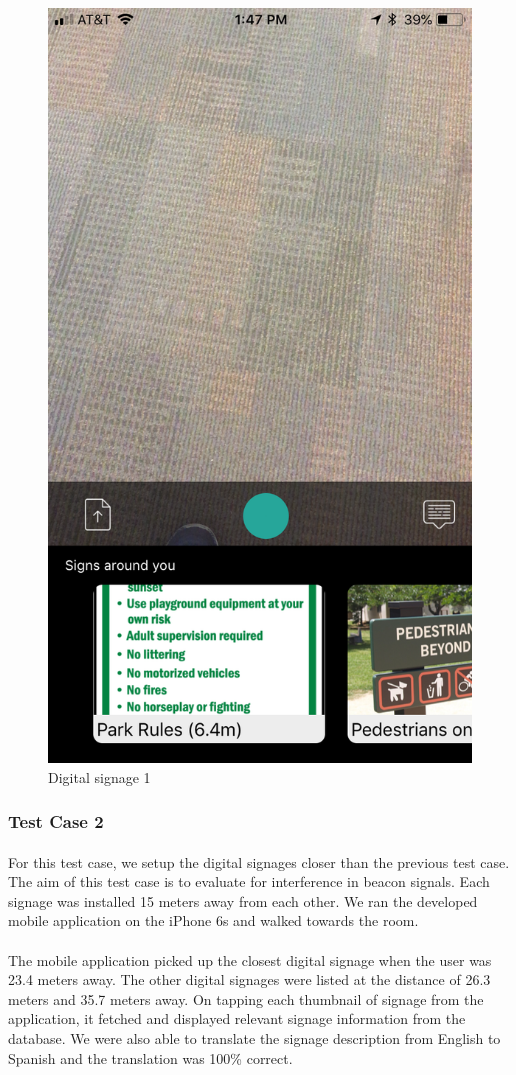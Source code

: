 \documentclass[12pt]{article}
\begin{document}
       \begin{figure}[H]
	\centering
	\includegraphics[width=0.5\linewidth]{media/test1.png}
	\caption{Digital signage 1}
	\label{fig:engyo}
\end{figure} 

\subsubsection{Test Case 2}
\label{one2one}
\paragraph{}For this test case, we setup the digital signages closer than the previous test case. The aim of this test case is to evaluate for interference in beacon signals. Each signage was installed  15 meters away from each other. We ran the developed mobile application on the iPhone 6s and walked towards the room.

\paragraph{}The mobile application picked up the closest digital signage when the user was 23.4 meters away. The other digital signages were listed at the distance of 26.3 meters and 35.7 meters away. On tapping each thumbnail of signage from the application, it fetched and displayed relevant signage information from the database. We were also able to translate the signage description from English to Spanish and the translation was 100\% correct.
\end{document}
